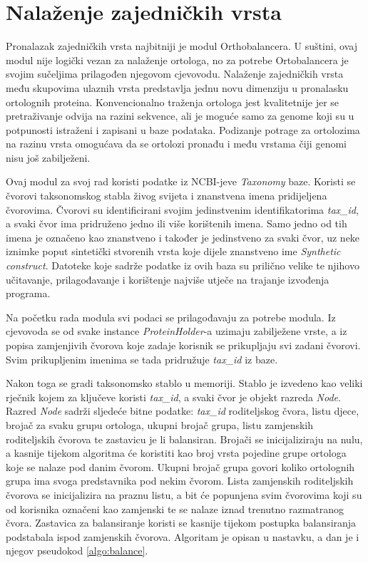 \chapter{Nalaženje zajedničkih vrsta}
\label{chap:tax}

Pronalazak zajedničkih vrsta najbitniji je modul Orthobalancera. U suštini, ovaj
modul nije logički vezan za nalaženje ortologa, no za potrebe Ortobalancera je
svojim sučeljima prilagođen njegovom cjevovodu. Nalaženje zajedničkih vrsta među
skupovima ulaznih vrsta predstavlja jednu novu dimenziju u pronalasku ortolognih
proteina. Konvencionalno traženja ortologa\cite{Tatusov, Baratham} jest
kvalitetnije jer se pretraživanje odvija na razini sekvence, ali je moguće samo
za genome koji su u potpunosti istraženi i zapisani u baze
podataka.\cite{Flicek} Podizanje potrage za ortolozima na razinu vrsta omogućava
da se ortolozi pronađu i među vrstama čiji genomi nisu još zabilježeni.

Ovaj modul za svoj rad koristi podatke iz NCBI-jeve \emph{Taxonomy} baze.
Koristi se čvorovi taksonomskog stabla živog svijeta i znanstvena imena
pridijeljena čvorovima. Čvorovi su identificirani svojim jedinstvenim
identifikatorima \emph{tax\_id}, a svaki čvor ima pridruženo jedno ili više
korištenih imena. Samo jedno od tih imena je označeno kao znanstveno i također
je jedinstveno za svaki čvor, uz neke iznimke poput sintetički stvorenih vrsta
koje dijele znanstveno ime \emph{Synthetic construct}. Datoteke koje sadrže
podatke iz ovih baza su prilično velike te njihovo učitavanje, prilagođavanje i
korištenje najviše utječe na trajanje izvođenja programa.

Na početku rada modula svi podaci se prilagođavaju za potrebe modula. Iz
cjevovoda se od svake instance \emph{ProteinHolder}-a uzimaju zabilježene vrste,
a iz popisa zamjenjivih čvorova koje zadaje korisnik se prikupljaju svi zadani
čvorovi. Svim prikupljenim imenima se tada pridružuje \emph{tax\_id} iz baze.

Nakon toga se gradi taksonomsko stablo u memoriji. Stablo je izvedeno kao veliki
rječnik kojem za ključeve koristi \emph{tax\_id}, a svaki čvor je objekt razreda
\emph{Node}. Razred \emph{Node} sadrži sljedeće bitne podatke: \emph{tax\_id}
roditeljskog čvora, listu djece, brojač za svaku grupu ortologa, ukupni brojač
grupa, listu zamjenskih roditeljskih čvorova te zastavicu je li balansiran.
Brojači se inicijaliziraju na nulu, a kasnije tijekom algoritma će koristiti kao
broj vrsta pojedine grupe ortologa koje se nalaze pod danim čvorom. Ukupni
brojač grupa govori koliko ortolognih grupa ima svoga predstavnika pod nekim
čvorom. Lista zamjenskih roditeljskih čvorova se inicijalizira na praznu listu,
a bit će popunjena svim čvorovima koji su od korisnika označeni kao zamjenski te
se nalaze iznad trenutno razmatranog čvora. Zastavica za balansiranje koristi se
kasnije tijekom postupka balansiranja podstabala ispod zamjenskih čvorova.
Algoritam je opisan u nastavku, a dan je i njegov pseudokod \ref{algo:balance}.

